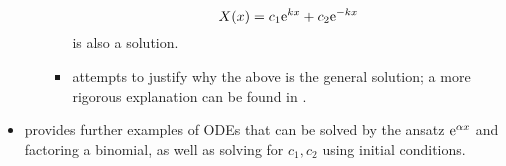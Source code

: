 \documentclass[../notes.tex]{subfiles}
\begin{document}
\begin{itemize}
\begin{itemize}
\begin{itemize}
\begin{equation*}
                X(x) = c_1\e[kx]+c_2\e[-kx]
            \end{equation*}
            is also a solution.
            \item \textcite{bib:McQuarrieSimon} attempts to justify why the above is the general solution; a more rigorous explanation can be found in \textcite{bib:MATH25700Notes}.
        \end{itemize}
    \end{itemize}
    \item \textcite{bib:McQuarrieSimon} provides further examples of ODEs that can be solved by the ansatz $\e[\alpha x]$ and factoring a binomial, as well as solving for $c_1,c_2$ using initial conditions.
\end{itemize}
\end{document}
